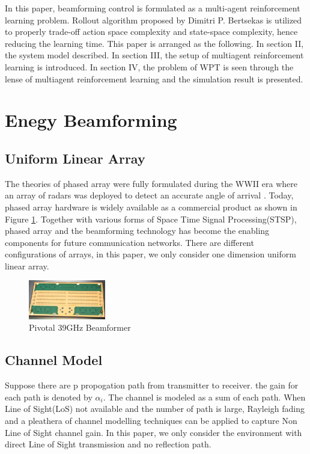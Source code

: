 \documentclass[journal]{IEEEtran}
\begin{document}
In this paper, beamforming control is formulated as a multi-agent reinforcement learning problem. Rollout algorithm proposed by Dimitri P. Bertsekas \cite{Bertsekas2019MultiagentRA} is utilized to properly trade-off action space complexity and state-space complexity, hence reducing the learning time. This paper is arranged as the following. In section II, the system model described. In section III, the setup of multiagent reinforcement learning is introduced. In section IV, the problem of WPT is seen through the lense of multiagent reinforcement learning and the simulation result is presented.


\section{Enegy Beamforming}
\subsection{Uniform Linear Array}
The theories of phased array were fully formulated during the WWII era where an array of radars was deployed to detect an accurate angle of arrival \cite{5237174}. Today, phased array hardware is widely available as a commercial product as shown in Figure \ref{fig:pivotal}. Together with various forms of Space Time Signal Processing(STSP), phased array and the beamforming technology has become the enabling components for future communication networks. There are different configurations of arrays, in this paper, we only consider one dimension uniform linear array.

\begin{figure}[H]
\centering
\includegraphics[width=0.3\textwidth]{beamformer.png}
\caption{Pivotal 39GHz Beamformer}
\label{fig:pivotal}
\end{figure}
\subsection{Channel Model}

Suppose there are p propogation path from transmitter to receiver. the gain for each path is denoted by $\alpha_i$. The channel is modeled as a sum of each path. When Line of Sight(LoS) not available and the number of path is large, Rayleigh fading and a pleathera of channel modelling techniques can be applied to capture Non Line of Sight channel gain. In this paper, we only consider the environment with direct Line of Sight transmission and no reflection path.
\end{document}
